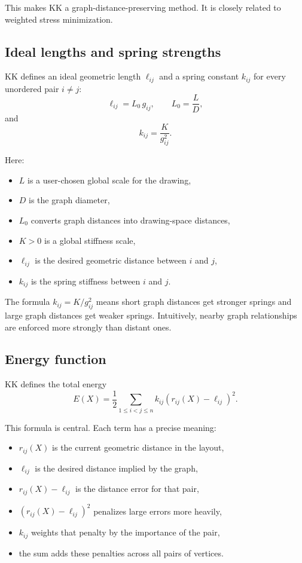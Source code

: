 \documentclass[11pt]{article}
\begin{document}
This makes KK a graph-distance-preserving method. It is closely related to
weighted stress minimization.

\subsection{Ideal lengths and spring strengths}

KK defines an ideal geometric length $\ell_{ij}$ and a spring constant
$k_{ij}$ for every unordered pair $i \neq j$:
\[
\ell_{ij} = L_0 \, g_{ij}, \qquad L_0 = \frac{L}{D},
\]
and
\[
k_{ij} = \frac{K}{g_{ij}^2}.
\]

Here:
\begin{itemize}[leftmargin=1.5em]
\item $L$ is a user-chosen global scale for the drawing,
\item $D$ is the graph diameter,
\item $L_0$ converts graph distances into drawing-space distances,
\item $K > 0$ is a global stiffness scale,
\item $\ell_{ij}$ is the desired geometric distance between $i$ and $j$,
\item $k_{ij}$ is the spring stiffness between $i$ and $j$.
\end{itemize}

The formula $k_{ij} = K / g_{ij}^2$ means short graph distances get stronger
springs and large graph distances get weaker springs. Intuitively, nearby graph
relationships are enforced more strongly than distant ones.

\subsection{Energy function}

KK defines the total energy
\[
E(X) = \frac{1}{2} \sum_{1 \le i < j \le n}
k_{ij} \left(r_{ij}(X) - \ell_{ij}\right)^2.
\]

This formula is central. Each term has a precise meaning:
\begin{itemize}[leftmargin=1.5em]
\item $r_{ij}(X)$ is the current geometric distance in the layout,
\item $\ell_{ij}$ is the desired distance implied by the graph,
\item $r_{ij}(X) - \ell_{ij}$ is the distance error for that pair,
\item $\left(r_{ij}(X) - \ell_{ij}\right)^2$ penalizes large errors more heavily,
\item $k_{ij}$ weights that penalty by the importance of the pair,
\item the sum adds these penalties across all pairs of vertices.
\end{itemize}
\end{document}
